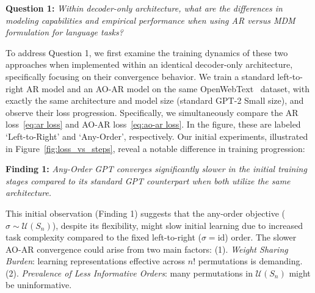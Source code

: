\begin{tcolorbox}[
    enhanced,
    colback=LightGoldenrodYellow!40,
    colframe=black!20,
    arc=2mm, 
    boxrule=0.5pt, 
    boxsep=0mm,
    before skip=2mm,
    after skip=2mm
]
\textbf{Question 1:} \textit{Within decoder-only architecture, what are the differences in modeling capabilities and empirical performance when using AR versus MDM formulation for language tasks?}
\end{tcolorbox}
To address Question 1, we first examine the training dynamics of these two approaches when implemented within an identical decoder-only architecture, specifically focusing on their convergence behavior. We train a standard left-to-right AR model and an AO-AR model on the same OpenWebText~\cite{Gokaslan2019OpenWeb} dataset, with exactly the same architecture and model size (standard GPT-2 Small size), and observe their loss progression. Specifically, we simultaneously compare the AR loss~\cref{eq:ar loss} and AO-AR loss~\cref{eq:ao-ar loss}. In the figure, these are labeled `Left-to-Right' and `Any-Order', respectively. Our initial experiments, illustrated in Figure~\ref{fig:loss_vs_steps}, reveal a notable difference in training progression:
\begin{tcolorbox}[
    enhanced,
    colback=LightGoldenrodYellow!40,
    colframe=black!20,
    arc=2mm, 
    boxrule=0.5pt, 
    boxsep=0mm,
    before skip=2mm,
    after skip=2mm
]
\textbf{Finding 1:} \textit{Any-Order GPT converges significantly slower in the initial training stages compared to its standard GPT counterpart when both utilize the same architecture.}
\end{tcolorbox}
This initial observation (Finding 1) suggests that the any-order objective ($\sigma \sim \mathcal{U}(S_n)$), despite its flexibility, might slow initial learning due to increased task complexity compared to the fixed left-to-right ($\sigma = \text{id}$) order. The slower AO-AR convergence could arise from two main factors: (1). \textit{Weight Sharing Burden}: learning representations effective across $n!$ permutations is demanding.
(2). \textit{Prevalence of Less Informative Orders}: many permutations in $\mathcal{U}(S_n)$ might be uninformative.

